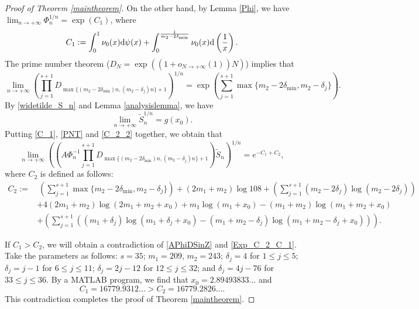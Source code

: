 \documentclass[11pt]{amsart}
\numberwithin{equation}{section}
\begin{document}
\begin{proof}[Proof of Theorem \ref{maintheorem}]
On the other hand, by Lemma \ref{Phi}, we have $\lim_{n\rightarrow +\infty}  \Phi_{n}^{1/n} = \exp(C_1)$, where
\begin{equation}\label{C_1}
C_1 :=  \int_{0}^{1} \nu_0(x) {\rm d} \psi(x) + \int_{0}^{\frac{1}{m_2-2\delta_{\min}}} \nu_0(x) {\rm d} \left( \frac{1}{x} \right).
\end{equation}
The prime number theorem ($D_{N} = \exp((1+o_{N \rightarrow +\infty}(1))N)$) implies that
\begin{equation}\label{PNT}
\lim_{n\rightarrow +\infty} \left(\prod_{j=1}^{s+1} D_{\max\{ (m_2-2\delta_{\min})n, (m_2 - \delta_j)n \}+1} \right)^{1/n} = \exp\left(\sum_{j=1}^{s+1} \max\{ m_2- 2\delta_{\min},m_2 - \delta_j \}\right).
\end{equation}
By \eqref{widetilde_S_n} and Lemma \ref{analysislemma}, we have
\begin{equation}\label{C_2_2}
\lim_{n\rightarrow +\infty} \widetilde{S}_{n}^{1/n} = g(x_0).
\end{equation}
Putting \eqref{C_1}, \eqref{PNT} and \eqref{C_2_2} together, we obtain that
\begin{equation}\label{Exp_C_2_C_1}
\lim_{n \rightarrow +\infty} \left(\left( A\Phi_{n}^{-1}  \prod_{j=1}^{s+1} D_{\max\{ (m_2-2\delta_{\min})n, (m_2 - \delta_j)n \}+1} \right) \widetilde{S}_{n} \right)^{1/n} = e^{-C_1+C_2},
\end{equation}
where $C_2$ is defined as follows:
\begin{align*}
C_2 := &~ \left(\sum_{j=1}^{s+1} \max\{ m_2- 2\delta_{\min},m_2 - \delta_j \} \right) + (2m_1+m_2)\log 108 + \left(\sum_{j=1}^{s+1} (m_2-2\delta_j) \log (m_2-2\delta_j) \right) \\
&+ 4(2m_1+m_2)\log (2m_1+m_2+x_0) + m_1 \log (m_1+x_0) - (m_1+m_2) \log(m_1+m_2+x_0) \\
&+ \left( \sum_{j=1}^{s+1} \left( (m_1+\delta_j)\log(m_1+\delta_j+x_0) - (m_1+m_2-\delta_j) \log (m_1+m_2-\delta_j+x_0) \right) \right).
\end{align*}

If $C_1 > C_2$, we will obtain a contradiction of \eqref{APhiDSinZ} and \eqref{Exp_C_2_C_1}. Take the parameters as follows: $s=35$; $m_1=209$, $m_2=243$; $\delta_j =4$ for $1 \leqslant j \leqslant 5$; $\delta_j = j-1$ for $6 \leqslant j \leqslant 11$; $\delta_j = 2j-12$ for $12 \leqslant j \leqslant 32$; and $\delta_{j} = 4j-76$ for $33 \leqslant j \leqslant 36$. By a MATLAB program, we find that $x_0 = 2.89493833\ldots$ and
\[ C_1 = 16779.9312\ldots > C_2 = 16779.2826\ldots.\]
This contradiction completes the proof of Theorem \ref{maintheorem}.
\end{proof}
\end{document}
